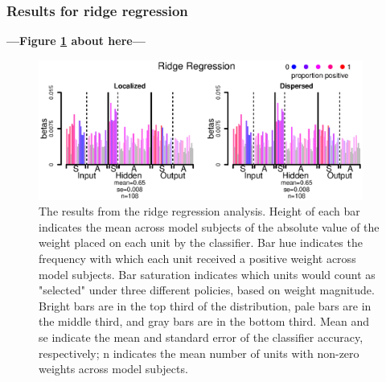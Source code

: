 \subsubsection{Results for ridge regression}

\begin{center}
\textbf{---Figure \ref{fig.ridge} about here---}
\end{center}

\begin{figure}
\centering
\includegraphics[width=0.95\textwidth]{figures/ridge_only.eps}
\caption{\label{fig.ridge} The results from the ridge regression analysis. Height of each bar indicates the mean across model subjects of the absolute value of the weight placed on each unit by the classifier. Bar hue indicates the frequency with which each unit received a positive weight across model subjects. Bar saturation indicates which units would count as "selected" under three different policies, based on weight magnitude. Bright bars are in the top third of the distribution, pale bars are in the middle third, and gray bars are in the bottom third. Mean and se indicate the mean and standard error of the classifier accuracy, respectively; n indicates the mean number of units with non-zero weights across model subjects.}
\end{figure}

